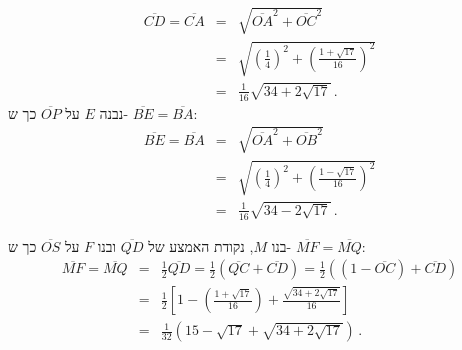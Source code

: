 \documentclass[11pt,a4paper]{article}
\newenvironment{form}[1]{%
\begin{displaymath}%
\renewcommand{\arraystretch}{#1}%
\begin{array}{lcl}}%
{\end{array}%
\end{displaymath}%
}
\newcommand*{\disfrac}[2]{\displaystyle\frac{#1}{#2}}
\begin{document}
\begin{form}{2}
\overline{CD}=\overline{CA}&=&\sqrt{\overline{OA}^2+\overline{OC}^2}\\
&=&\sqrt{\left(\disfrac{1}{4}\right)^2+\left(\disfrac{1+\sqrt{17}}{16}\right)^2}\\
&=&\disfrac{1}{16}\sqrt{34+2\sqrt{17}}\,.
\end{form}
נבנה
$E$
על
$\overline{OP}$
כך ש-%
$\overline{BE}=\overline{BA}$:
\begin{form}{2}
\overline{BE}=\overline{BA}&=&\sqrt{\overline{OA}^2+\overline{OB}^2}\\
&=&\sqrt{\left(\disfrac{1}{4}\right)^2+\left(\disfrac{1-\sqrt{17}}{16}\right)^2}\\
&=&\disfrac{1}{16}\sqrt{34-2\sqrt{17}}\,.
\end{form}

בנו
$M$,
נקודת האמצע של
$\overline{QD}$
ובנו
$F$
על
$\overline{OS}$
כך ש-%
$\overline{MF}=\overline{MQ}$:
\begin{form}{2}
\overline{MF}=\overline{MQ}&=&\disfrac{1}{2}\overline{QD}=\disfrac{1}{2}(\overline{QC}+\overline{CD})=\disfrac{1}{2}((1-\overline{OC})+\overline{CD})\\
&=&\disfrac{1}{2}\left[1-\left(\disfrac{1+\sqrt{17}}{16}\right)+\disfrac{\sqrt{34+2\sqrt{17}}}{16}\right]\\
&=&\disfrac{1}{32}\left(15-\sqrt{17}+\sqrt{34+2\sqrt{17}}\right)\,.
\end{form}

\newpage
\end{document}

